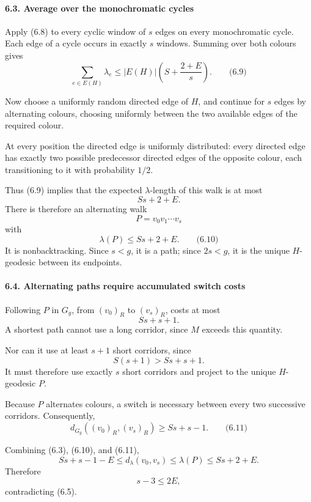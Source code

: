 \documentclass[
  11pt,
  a4paper,
]{article}
\begin{document}
\paragraph{6.3. Average over the monochromatic
cycles}\label{average-over-the-monochromatic-cycles}

Apply (6.8) to every cyclic window of \(s\) edges on every monochromatic
cycle. Each edge of a cycle occurs in exactly \(s\) windows. Summing
over both colours gives \[
\sum_{e\in E(H)}\lambda_e
\le
|E(H)|\left(S+\frac{2+E}{s}\right).
\qquad\text{(6.9)}
\]

Now choose a uniformly random directed edge of \(H\), and continue for
\(s\) edges by alternating colours, choosing uniformly between the two
available edges of the required colour.

At every position the directed edge is uniformly distributed: every
directed edge has exactly two possible predecessor directed edges of the
opposite colour, each transitioning to it with probability \(1/2\).

Thus (6.9) implies that the expected \(\lambda\)-length of this walk is
at most \[
Ss+2+E.
\] There is therefore an alternating walk \[
P=v_0v_1\cdots v_s
\] with \[
\lambda(P)\le Ss+2+E.
\qquad\text{(6.10)}
\] It is nonbacktracking. Since \(s<g\), it is a path; since \(2s<g\),
it is the unique \(H\)-geodesic between its endpoints.

\paragraph{6.4. Alternating paths require accumulated switch
costs}\label{alternating-paths-require-accumulated-switch-costs}

Following \(P\) in \(G_g\), from \((v_0)_R\) to \((v_s)_R\), costs at
most \[
Ss+s+1.
\] A shortest path cannot use a long corridor, since \(M\) exceeds this
quantity.

Nor can it use at least \(s+1\) short corridors, since \[
S(s+1)>Ss+s+1.
\] It must therefore use exactly \(s\) short corridors and project to
the unique \(H\)-geodesic \(P\).

Because \(P\) alternates colours, a switch is necessary between every
two successive corridors. Consequently, \[
d_{G_g}((v_0)_R,(v_s)_R)\ge Ss+s-1.
\qquad\text{(6.11)}
\]

Combining (6.3), (6.10), and (6.11), \[
Ss+s-1-E
\le d_\lambda(v_0,v_s)
\le \lambda(P)
\le Ss+2+E.
\] Therefore \[
s-3\le2E,
\] contradicting (6.5).
\end{document}

